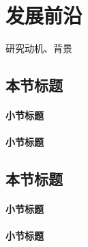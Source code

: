 \chapter{发展前沿}
研究动机、背景

\section{本节标题}

\subsubsection{小节标题}

\newpage

\subsubsection{小节标题}

\section{本节标题}

\subsubsection{小节标题}

\subsubsection{小节标题}

